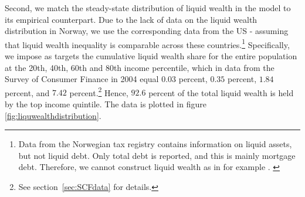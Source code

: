 \documentclass[../HAFiscal]{subfiles}
\begin{document}
Second, we match the steady-state distribution of liquid wealth in the model to its empirical counterpart. Due to the lack of data on the liquid wealth distribution in Norway, we use the corresponding data from the US - assuming that liquid wealth inequality is comparable across these countries.\footnote{Data from the Norwegian tax registry contains information on liquid assets, but not liquid debt. Only total debt is reported, and this is mainly mortgage debt. Therefore, we cannot construct liquid wealth as in for example \citet{kaplan2014model}. \label{foot:liqwealth}} Specifically, we impose as targets the cumulative liquid wealth share for the entire population at the 20th, 40th, 60th and 80th income percentile, which in data from the Survey of Consumer Finance in 2004 equal $0.03$ percent, $0.35$ percent, $1.84$ percent, and $7.42$ percent.\footnote{See section~\ref{sec:SCFdata} for details.} Hence, $92.6$ percent of the total liquid wealth is held by the top income quintile. The data is plotted in figure \ref{fig:liquwealthdistribution}.
\end{document}
